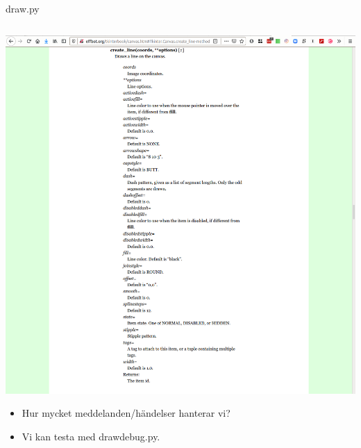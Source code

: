 \begin{frame}[fragile]
  draw.py \hrulefill
  \inputminted[linenos,firstline=24,lastline=40]{python}{examples/draw.py}
\end{frame}

\begin{frame}
  \href{http://effbot.org/tkinterbook/canvas.htm\#Tkinter.Canvas.create_line-method}{%
    \includegraphics[width=\columnwidth]{figs/docs-create_line.png}
  }
\end{frame}

\begin{frame}
  \begin{question}
    \begin{itemize}
      \item Hur mycket meddelanden/händelser hanterar vi?
    \end{itemize}
  \end{question}

  \pause

  \begin{solution}
    \begin{itemize}
      \item Vi kan testa med draw\textunderscore debug.py.
    \end{itemize}
  \end{solution}
\end{frame}

